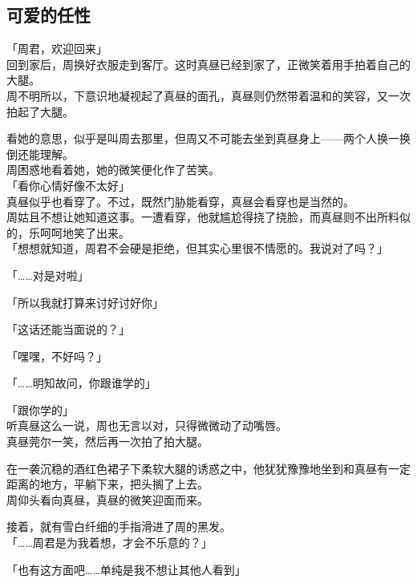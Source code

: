 \subsection{可爱的任性}

「周君，欢迎回来」\\

回到家后，周换好衣服走到客厅。这时真昼已经到家了，正微笑着用手拍着自己的大腿。\\

周不明所以，下意识地凝视起了真昼的面孔，真昼则仍然带着温和的笑容，又一次拍起了大腿。

看她的意思，似乎是叫周去那里，但周又不可能去坐到真昼身上——两个人换一换倒还能理解。\\

周困惑地看着她，她的微笑便化作了苦笑。\\

「看你心情好像不太好」\\

真昼似乎也看穿了。不过，既然门胁能看穿，真昼会看穿也是当然的。\\

周姑且不想让她知道这事。一遭看穿，他就尴尬得挠了挠脸，而真昼则不出所料似的，乐呵呵地笑了出来。\\

「想想就知道，周君不会硬是拒绝，但其实心里很不情愿的。我说对了吗？」

「……对是对啦」

「所以我就打算来讨好讨好你」

「这话还能当面说的？」

「嘿嘿，不好吗？」

「……明知故问，你跟谁学的」

「跟你学的」\\

听真昼这么一说，周也无言以对，只得微微动了动嘴唇。\\

真昼莞尔一笑，然后再一次拍了拍大腿。

在一袭沉稳的酒红色裙子下柔软大腿的诱惑之中，他犹犹豫豫地坐到和真昼有一定距离的地方，平躺下来，把头搁了上去。\\

周仰头看向真昼，真昼的微笑迎面而来。

接着，就有雪白纤细的手指滑进了周的黑发。\\

「……周君是为我着想，才会不乐意的？」

「也有这方面吧……单纯是我不想让其他人看到」

